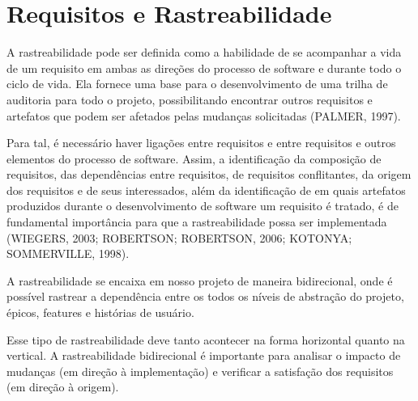 \section[Requisitos e Rastreabilidade]{Requisitos e Rastreabilidade}
A rastreabilidade pode ser definida como a habilidade de se acompanhar a vida
de um requisito em ambas as direções do processo de software e durante todo o ciclo de
vida. Ela fornece uma base para o desenvolvimento de uma trilha de auditoria para todo
o projeto, possibilitando encontrar outros requisitos e artefatos que podem ser afetados
pelas mudanças solicitadas (PALMER, 1997). 

Para tal, é necessário haver ligações entre requisitos e entre requisitos e outros elementos do processo de software. Assim, a identificação da composição de requisitos, das dependências entre requisitos, de
requisitos conflitantes, da origem dos requisitos e de seus interessados, além da
identificação de em quais artefatos produzidos durante o desenvolvimento de software
um requisito é tratado, é de fundamental importância para que a rastreabilidade possa
ser implementada (WIEGERS, 2003; ROBERTSON; ROBERTSON, 2006;
KOTONYA; SOMMERVILLE, 1998). 

A rastreabilidade se encaixa em nosso projeto de maneira bidirecional, onde é
possível rastrear a dependência entre os todos os níveis de abstração do projeto,
épicos, features e histórias de usuário.

Esse tipo de rastreabilidade deve tanto acontecer na forma horizontal quanto
na vertical. A rastreabilidade bidirecional é importante para analisar o impacto
de mudanças (em direção à implementação) e verificar a satisfação dos
requisitos (em direção à origem).
